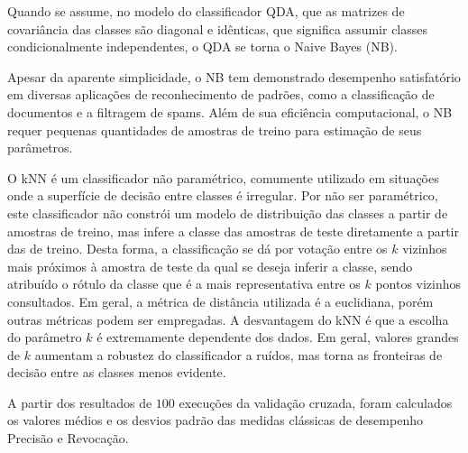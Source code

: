 Quando se assume, no modelo do classificador \ac{QDA}, que as matrizes de covariância das classes são diagonal e idênticas, que significa assumir classes condicionalmente independentes, o \ac{QDA} se torna o Naive Bayes (\ac{NB}). 

Apesar da aparente simplicidade, o \ac{NB} tem demonstrado desempenho satisfatório em diversas aplicações de reconhecimento de padrões, como a classificação de documentos e a filtragem de spams. Além de sua eficiência computacional, o \ac{NB} requer pequenas quantidades de amostras de treino para estimação de seus parâmetros.

O \ac{kNN} é um classificador não paramétrico, comumente utilizado em situações onde a superfície de decisão entre classes é irregular. Por não ser paramétrico, este classificador não constrói um modelo de distribuição das classes a partir de amostras de treino, mas infere a classe das amostras de teste diretamente a partir das de treino. Desta forma, a classificação se dá por votação entre os $k$ vizinhos mais próximos à amostra de teste da qual se deseja inferir a classe, sendo atribuído o rótulo da classe que é a mais representativa entre os $k$ pontos vizinhos consultados. Em geral, a métrica de distância utilizada é a euclidiana, porém outras métricas podem ser empregadas. A desvantagem do \ac{kNN} é que a escolha do parâmetro $k$ é extremamente dependente dos dados. Em geral, valores grandes de $k$ aumentam a robustez do classificador a ruídos, mas torna as fronteiras de decisão entre as classes menos evidente.

A partir dos resultados de $100$ execuções da validação cruzada, foram calculados os valores médios e os desvios padrão das medidas clássicas de desempenho Precisão e Revocação.







